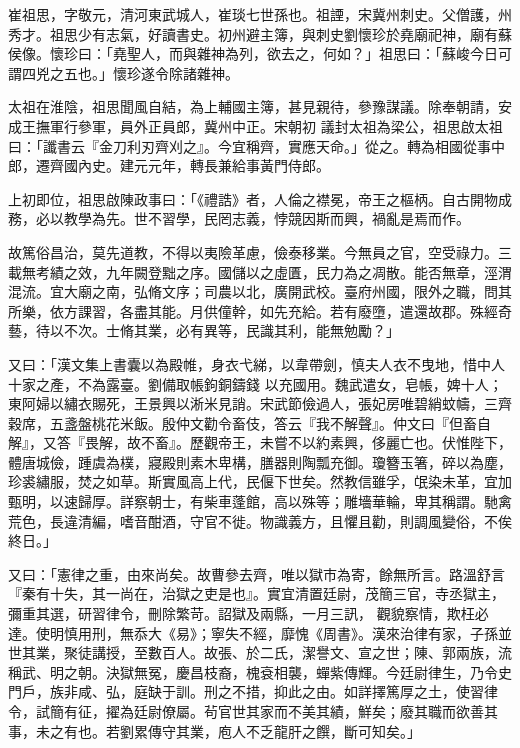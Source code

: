 
\begin{pinyinscope}

 崔祖思，字敬元，清河東武城人，崔琰七世孫也。祖諲，宋冀州刺史。父僧護，州秀才。祖思少有志氣，好讀書史。初州避主簿，與刺史劉懷珍於堯廟祀神，廟有蘇侯像。懷珍曰：「堯聖人，而與雜神為列，欲去之，何如？」祖思曰：「蘇峻今日可謂四兇之五也。」懷珍遂令除諸雜神。



 太祖在淮陰，祖思聞風自結，為上輔國主簿，甚見親待，參豫謀議。除奉朝請，安成王撫軍行參軍，員外正員郎，冀州中正。宋朝初
 議封太祖為梁公，祖思啟太祖曰：「讖書云『金刀利刃齊刈之』。今宜稱齊，實應天命。」從之。轉為相國從事中郎，遷齊國內史。建元元年，轉長兼給事黃門侍郎。



 上初即位，祖思啟陳政事曰：「《禮誥》者，人倫之襟冕，帝王之樞柄。自古開物成務，必以教學為先。世不習學，民罔志義，悖競因斯而興，禍亂是焉而作。



 故篤俗昌治，莫先道教，不得以夷險革慮，儉泰移業。今無員之官，空受祿力。三載無考績之效，九年闕登黜之序。國儲以之虛匱，民力為之凋散。能否無章，涇渭混流。宜大廟之南，弘脩文序；司農以北，廣開武校。臺府州國，限外之職，問其所樂，依方課習，各盡其能。月供僮幹，如先充給。若有廢墮，遣還故郡。殊經奇藝，待以不次。士脩其業，必有異等，民識其利，能無勉勵？」



 又曰：「漢文集上書囊以為殿帷，身衣弋綈，以韋帶劍，慎夫人衣不曳地，惜中人十家之產，不為露臺。劉備取帳鉤銅鑄錢
 以充國用。魏武遣女，皂帳，婢十人；東阿婦以繡衣賜死，王景興以淅米見誚。宋武節儉過人，張妃房唯碧綃蚊幬，三齊穀席，五盞盤桃花米飯。殷仲文勸令畜伎，答云『我不解聲』。仲文曰『但畜自解』，又答『畏解，故不畜』。歷觀帝王，未嘗不以約素興，侈麗亡也。伏惟陛下，體唐城儉，踵虞為樸，寢殿則素木卑構，膳器則陶瓢充御。瓊簪玉箸，碎以為塵，珍裘繡服，焚之如草。斯實風高上代，民偃下世矣。然教信雖孚，氓染未革，宜加甄明，以速歸厚。詳察朝士，有柴車蓬館，高以殊等；雕墻華輪，卑其稱謂。馳禽荒色，長違清編，嗜音酣酒，守官不徙。物識義方，且懼且勸，則調風變俗，不俟終日。」



 又曰：「憲律之重，由來尚矣。故曹參去齊，唯以獄市為寄，餘無所言。路溫舒言『秦有十失，其一尚在，治獄之吏是也』。實宜清置廷尉，茂簡三官，寺丞獄主，彌重其選，研習律令，刪除繁苛。詔獄及兩縣，一月三訊，
 觀貌察情，欺枉必達。使明慎用刑，無忝大《易》；寧失不經，靡愧《周書》。漢來治律有家，子孫並世其業，聚徒講授，至數百人。故張、於二氏，潔譽文、宣之世；陳、郭兩族，流稱武、明之朝。決獄無冤，慶昌枝裔，槐袞相襲，蟬紫傳輝。今廷尉律生，乃令史門戶，族非咸、弘，庭缺于訓。刑之不措，抑此之由。如詳擇篤厚之土，使習律令，試簡有征，擢為廷尉僚屬。茍官世其家而不美其績，鮮矣；廢其職而欲善其事，未之有也。若劉累傳守其業，庖人不乏龍肝之饌，斷可知矣。」




\end{pinyinscope}
